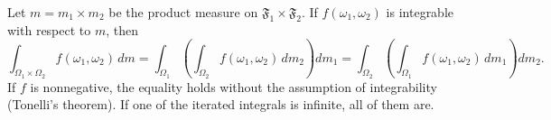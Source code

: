 Let $m = m_1 \times m_2$ be the product measure on $\mathfrak{F}_1 \times \mathfrak{F}_2$. If $f(\omega_1, \omega_2)$ is integrable with respect to $m$, then
$$\int_{\Omega_1 \times \Omega_2} f(\omega_1, \omega_2) \, dm = \int_{\Omega_1} \left( \int_{\Omega_2} f(\omega_1, \omega_2) \, dm_2 \right) dm_1 = \int_{\Omega_2} \left( \int_{\Omega_1} f(\omega_1, \omega_2) \, dm_1 \right) dm_2.$$
If $f$ is nonnegative, the equality holds without the assumption of integrability (Tonelli's theorem). If one of the iterated integrals is infinite, all of them are.
